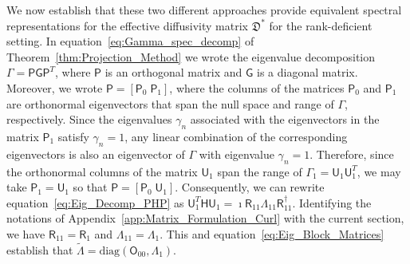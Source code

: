 \documentclass[english,12pt,jmp,graphicx]{revtex4-1}
\newcommand{\thmref}[1]{Theorem~\ref{#1}}
\newcommand{\appref}[1]{Appendix~\ref{#1}}
\newcommand{\Dg}{\mathfrak{D}}
\newcommand{\Hm}{\mathsf{H}}
\newcommand{\Um}{\mathsf{U}}
\newcommand{\Pm}{\mathsf{P}}
\newcommand{\Gm}{\mathsf{G}}
\newcommand{\Rm}{\mathsf{R}}
\newcommand{\Om}{\mathsf{O}}
\begin{document}
We now establish that these two different approaches provide
equivalent spectral representations for the effective diffusivity
matrix $\Dg^*$ for the rank-deficient setting.
In equation~\eqref{eq:Gamma_spec_decomp} of
\thmref{thm:Projection_Method} we wrote the eigenvalue decomposition
$\Gamma=\Pm\Gm\Pm^T$, where $\Pm$ is an orthogonal matrix and $\Gm$ is
a diagonal matrix. Moreover, we wrote 
$\Pm=[\Pm_0\;\Pm_1]$, where the columns of the matrices $\Pm_0$ and
$\Pm_1$ are orthonormal eigenvectors that span the null space and
range of $\Gamma$, respectively. Since the eigenvalues $\gamma_n$
associated with the eigenvectors in the matrix $\Pm_1$ satisfy
$\gamma_n=1$, any linear combination of the corresponding eigenvectors is
also an eigenvector of $\Gamma$ with eigenvalue $\gamma_n=1$. Therefore, since
the orthonormal columns of the matrix $\Um_1$ span the range of 
$\Gamma_1=\Um_1\Um_1^T$,
we may take
$\Pm_1=\Um_1$ so that $\Pm=[\Pm_0\;\Um_1]$. Consequently, we can
rewrite  equation~\eqref{eq:Eig_Decomp_PHP} as
$\Um_1^T\Hm\Um_1=\imath\Rm_{11}\Lambda_{11}\Rm_{11}^\dagger$. 
Identifying the notations of \appref{app:Matrix_Formulation_Curl} with
the current section, we have
$\Rm_{11}=\Rm_1$ and $\Lambda_{11}=\Lambda_1$. This and
equation~\eqref{eq:Eig_Block_Matrices} establish that
$\tilde{\Lambda}=\text{diag}(\Om_{00},\Lambda_1)$.
\end{document}

